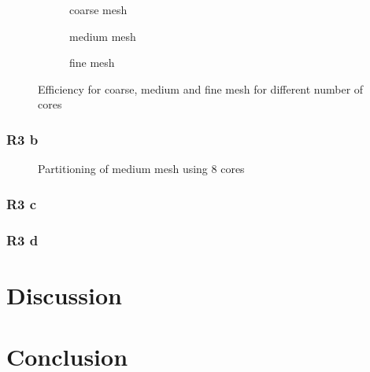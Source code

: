 \documentclass[a4paper, 11pt, oneside]{scrartcl}
\begin{document}
\begin{figure}[h!]
	\centering
	\begin{subfigure}{0.32\textwidth}
		\centering
		\resizebox{0.33\width}{!}{}
		\caption{\label{fig::EffcoarseMPI} coarse mesh}
	\end{subfigure}
	\hfill
	\begin{subfigure}{0.32\textwidth}
		\centering
		\resizebox{0.33\width}{!}{}
		\caption{\label{fig::EffmediumMPI} medium mesh}
	\end{subfigure}
	\hfill
	\begin{subfigure}{0.32\textwidth}
		\centering
		\resizebox{0.33\width}{!}{}
		\caption{\label{fig::EfffineMPI} fine mesh}
	\end{subfigure}
	\caption{\label{fig::EffMPI} Efficiency for coarse, medium and fine mesh for different number of cores}
\end{figure}

\subsubsection*{R3 b}

\begin{figure}[h!]
	\centering
	\caption{\label{fig::partition} Partitioning of medium mesh using 8 cores}
\end{figure}

\subsubsection*{R3 c}

\subsubsection*{R3 d}

\section{Discussion}



\section{Conclusion}

\blindtext



\end{document}
